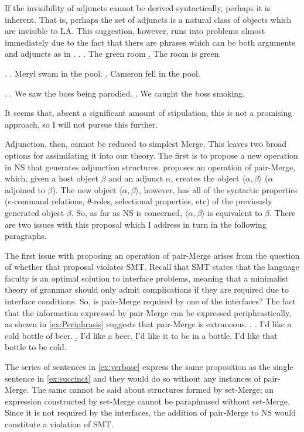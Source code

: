 \documentclass[MilwayThesis]{subfiles}
\begin{document}
If the invisibility of adjuncts cannot be derived syntactically, perhaps it is inherent.
That is, perhaps the set of adjuncts is a natural class of objects which are invisible to LA.
This suggestion, however, runs into problems almost immediately due to the fact that there are phrases which can be both arguments and adjuncts as in .
\ex. \label{ex:Adjective}
\a. The green room
\b. The room is green.

\ex. \label{ex:PP} 
\a. Meryl swam in the pool.
\b. Cameron fell in the pool.

\ex. \label{ex:ProgP}
\a. We saw the boss being parodied.
\b. We caught the boss smoking.

It seems that, absent a significant amount of stipulation, this is not a promising approach, so I will not pursue this further.

Adjunction, then, cannot be reduced to simplest Merge.
This leaves two broad options for assimilating it into our theory.
The first is to propose a new operation in NS that generates adjunction structures.
\textcite{chomsky2004beyond} proposes an operation of pair-Merge, which, given a host object $\beta$ and an adjunct $\alpha$, creates the object $\langle\alpha,\beta\rangle$ ($\alpha$ adjoined to $\beta$).
The new object $\langle\alpha,\beta\rangle$, however, has all of the syntactic properties (c-command relations, $\theta$-roles, selectional properties, etc) of the previously generated object $\beta$.
So, as far as NS is concerned, $\langle\alpha,\beta\rangle$ is equivalent to $\beta$.
There are two issues with this proposal which I address in turn in the following paragraphs.

The first issue with proposing an operation of pair-Merge arises from the question of whether that proposal violates SMT.
Recall that SMT states that the language faculty is an optimal solution to interface problems, meaning that a minimalist theory of grammar should only admit complications if they are required due to interface conditions.
So, is pair-Merge required by one of the interfaces?
The fact that the information expressed by pair-Merge can be expressed periphrastically, as shown in \cref{ex:Periphrasis} suggests that pair-Merge is extraneous.
\ex.\label{ex:Periphrasis}
\a. I'd like a cold bottle of beer.\label{ex:succinct}
\b. I'd like a beer. I'd like it to be in a bottle. I'd like that bottle to be cold.\label{ex:verbose}

The series of sentences in \cref{ex:verbose} express the same proposition as the single sentence in \cref{ex:succinct} and they would do so without any instances of pair-Merge.
The same cannot be said about structures formed by set-Merge; an expression constructed by set-Merge cannot be paraphrased without set-Merge.
Since it is not required by the interfaces, the addition of pair-Merge to NS would constitute a violation of SMT.
\end{document}
